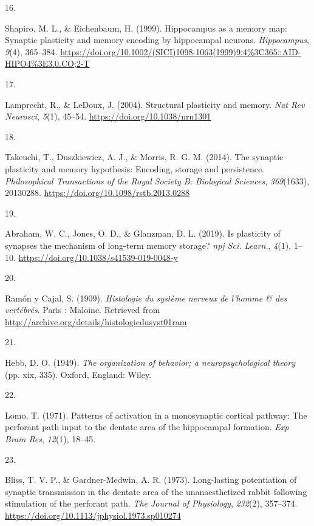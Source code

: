 \documentclass[
  11pt,
  letterpaper,
]{scrreprt}
\newlength{\cslhangindent}
\newlength{\csllabelwidth}
\newenvironment{CSLReferences}[2] %
 {\begin{list}{}{%
  \setlength{\itemindent}{0pt}
  \setlength{\leftmargin}{0pt}
  \setlength{\parsep}{0pt}
  \ifodd #1
   \setlength{\leftmargin}{\cslhangindent}
   \setlength{\itemindent}{-1\cslhangindent}
  \fi
  \setlength{\itemsep}{#2\baselineskip}}}
 {\end{list}}
\newcommand{\CSLLeftMargin}[1]{\parbox[t]{\csllabelwidth}{\strut#1\strut}}
\newcommand{\CSLRightInline}[1]{\parbox[t]{\linewidth - \csllabelwidth}{\strut#1\strut}}
\begin{document}
\begin{CSLReferences}{0}{0}
\CSLLeftMargin{16. }%
\CSLRightInline{Shapiro, M. L., \& Eichenbaum, H. (1999). Hippocampus as
a memory map: {Synaptic} plasticity and memory encoding by hippocampal
neurons. \emph{Hippocampus}, \emph{9}(4), 365--384.
\url{https://doi.org/10.1002/(SICI)1098-1063(1999)9:4\%3C365::AID-HIPO4\%3E3.0.CO;2-T}}

\CSLLeftMargin{17. }%
\CSLRightInline{Lamprecht, R., \& LeDoux, J. (2004). Structural
plasticity and memory. \emph{Nat Rev Neurosci}, \emph{5}(1), 45--54.
\url{https://doi.org/10.1038/nrn1301}}

\CSLLeftMargin{18. }%
\CSLRightInline{Takeuchi, T., Duszkiewicz, A. J., \& Morris, R. G. M.
(2014). The synaptic plasticity and memory hypothesis: Encoding, storage
and persistence. \emph{Philosophical Transactions of the Royal Society
B: Biological Sciences}, \emph{369}(1633), 20130288.
\url{https://doi.org/10.1098/rstb.2013.0288}}

\CSLLeftMargin{19. }%
\CSLRightInline{Abraham, W. C., Jones, O. D., \& Glanzman, D. L. (2019).
Is plasticity of synapses the mechanism of long-term memory storage?
\emph{npj Sci. Learn.}, \emph{4}(1), 1--10.
\url{https://doi.org/10.1038/s41539-019-0048-y}}

\CSLLeftMargin{20. }%
\CSLRightInline{Ramón y Cajal, S. (1909). \emph{Histologie du système
nerveux de l'homme \& des vertébrés}. Paris : Maloine. Retrieved from
\url{http://archive.org/details/histologiedusyst01ram}}

\CSLLeftMargin{21. }%
\CSLRightInline{Hebb, D. O. (1949). \emph{The organization of behavior;
a neuropsychological theory} (pp. xix, 335). Oxford, England: Wiley.}

\CSLLeftMargin{22. }%
\CSLRightInline{Lomo, T. (1971). Patterns of activation in a
monosynaptic cortical pathway: The perforant path input to the dentate
area of the hippocampal formation. \emph{Exp Brain Res}, \emph{12}(1),
18--45.}

\CSLLeftMargin{23. }%
\CSLRightInline{Bliss, T. V. P., \& Gardner-Medwin, A. R. (1973).
Long-lasting potentiation of synaptic transmission in the dentate area
of the unanaesthetized rabbit following stimulation of the perforant
path. \emph{The Journal of Physiology}, \emph{232}(2), 357--374.
\url{https://doi.org/10.1113/jphysiol.1973.sp010274}}


\end{CSLReferences}
\end{document}
